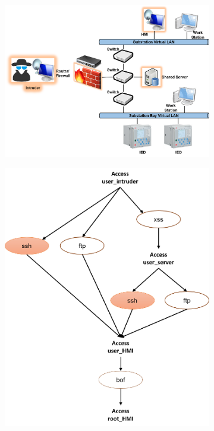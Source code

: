 \begin{figure}[htbp]
\begin{subfigure}{0.14\textwidth}
	\caption{}\label{sfig:graph-A}
	\end{subfigure}
	\begin{subfigure}{0.26\textwidth}
	\includegraphics[width=\textwidth]{B-model.png}
	\caption{}\label{sfig:model-B}
	\end{subfigure}
	\begin{subfigure}{0.16\textwidth}
	\includegraphics[width=\textwidth]{B-graph.png}

\end{subfigure}
\end{figure}
